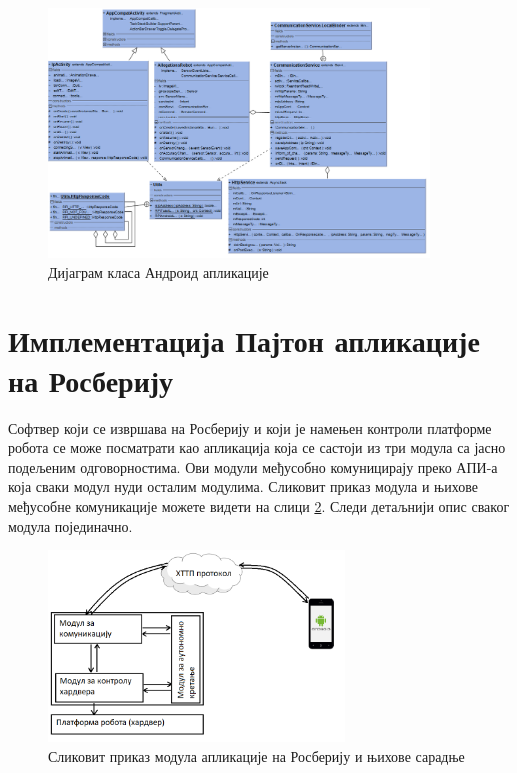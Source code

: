\documentclass[12pt,oneside]{memoir}
\theoremstyle{remark}
\begin{document}
\begin{figure}[!ht]
\centering
\includegraphics[width=0.9\textwidth]{slike/dijagramklasa.png}
\caption{Дијаграм класа Андроид апликације}
\label{fig:dijagramklasaapp}
\end{figure}

\section{Имплементација Пајтон апликације на Росберију}
Софтвер који се извршава на Росберију и који је намењен контроли платформе робота се може посматрати као апликација која се састоји из три модула са јасно подељеним одговорностима. Ови модули међусобно комуницирају преко АПИ-а која сваки модул нуди осталим модулима. Сликовит приказ модула и њихове међусобне комуникације можете видети на слици \ref{fig:rpisoftvare}.
Следи детаљнији опис сваког модула појединачно.
\begin{figure}[!ht]
\centering
\includegraphics[width=0.7\textwidth]{slike/rpisoftvers.png}
\caption{Сликовит приказ модула апликације на Росберију и њихове сарадње}
\label{fig:rpisoftvare}
\end{figure}
\end{document}

